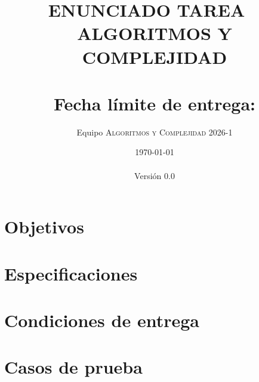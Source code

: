 \documentclass[10pt,spanish]{article} %
\title{
  \huge
  \textbf{ENUNCIADO TAREA \tnum~ \\ ALGORITMOS Y COMPLEJIDAD} \\[1ex]
  \emph{\textquote{AniMaraton}} \\[1ex]
  {\normalsize Fecha límite de entrega: \tcm{\deadline}}\\
  }
\author{
  Equipo \textsc{Algoritmos y Complejidad} 2026-1
}
\date{
  \small
  \today\\
  \currenttime\\
  Versión 0.0
}
\begin{document}
\maketitle
\thispagestyle{fancy} %
\vspace{-1.0\baselineskip}

\setlength{\epigraphwidth}{0.7\textwidth}



\setcounter{tocdepth}{2}
\tableofcontents

\newpage
\section{Objetivos}


\newpage
\section{Especificaciones}



\newpage
\section{Condiciones de entrega}


\newpage
\appendix

\section{Casos de prueba}\label{sec:test_cases}



\printbibliography
\end{document}
